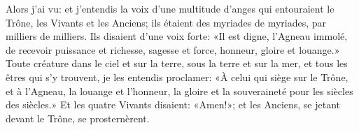 Alors j’ai vu:
	et j’entendis la voix d’une multitude d’anges qui entouraient le Trône,
		les Vivants et les Anciens;
	ils étaient des myriades de myriades, par milliers de milliers.
Ils disaient d’une voix forte:
	«Il est digne, l’Agneau immolé,
	de recevoir puissance et richesse, sagesse et force,
	honneur, gloire et louange.»
Toute créature dans le ciel et sur la terre, sous la terre et sur la mer,
	et tous les êtres qui s’y trouvent, je les entendis proclamer:
	«À celui qui siège sur le Trône, et à l’Agneau,
	la louange et l’honneur, la gloire et la souveraineté
	pour les siècles des siècles.»
Et les quatre Vivants disaient: «Amen!»;
	et les Anciens, se jetant devant le Trône, se prosternèrent.

